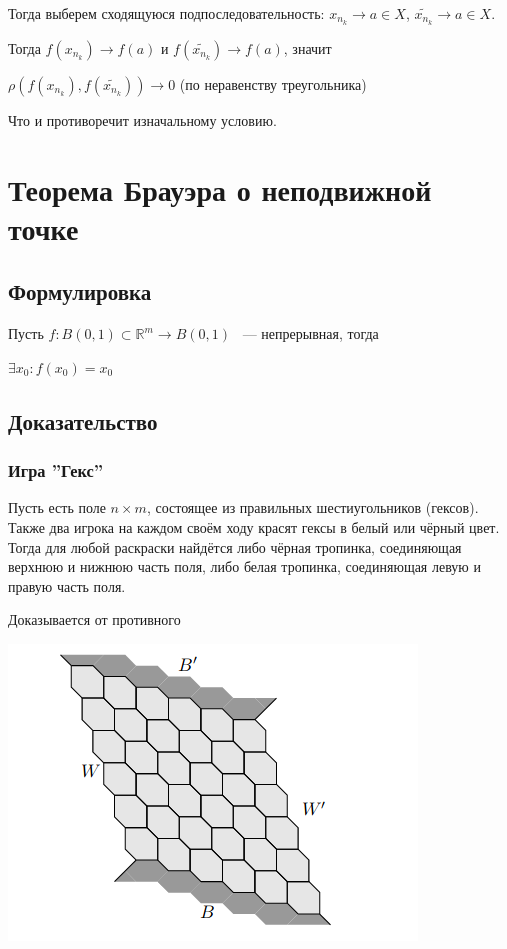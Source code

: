 \documentclass{article}
\begin{document}
			Тогда выберем сходящуюся подпоследовательность: $x_{n_k} \rightarrow a \in X$, $\widetilde{x_{n_k}} \rightarrow a \in X$.
			
			Тогда $f(x_{n_k}) \rightarrow f(a)$ и $f(\widetilde{x_{n_k}}) \rightarrow f(a)$, значит
			
			$\rho(f(x_{n_k}), f(\widetilde{x_{n_k}})) \rightarrow 0$ (по неравенству треугольника)
			
			Что и противоречит изначальному условию.

	\newpage
	
	\section{Теорема Брауэра о неподвижной точке}
	
		\subsection{Формулировка}
            
            Пусть $f: B(0, 1) \subset \mathbb{R}^m \rightarrow B(0, 1)$ ~--- непрерывная, тогда
		
            $\exists x_0 : f(x_0) = x_0$
		
		\subsection{Доказательство}
		
		\subsubsection{Игра ''Гекс''}
		
			Пусть есть поле $n \times m$, состоящее из правильных шестиугольников (гексов). Также два игрока на каждом своём ходу красят гексы в белый или чёрный цвет. Тогда для любой раскраски найдётся либо чёрная тропинка, соединяющая верхнюю и нижнюю часть поля, либо белая тропинка, соединяющая левую и правую часть поля.
			
			Доказывается от противного
		
			\includegraphics[scale=0.5]{HEX.png}
				
\end{document}
